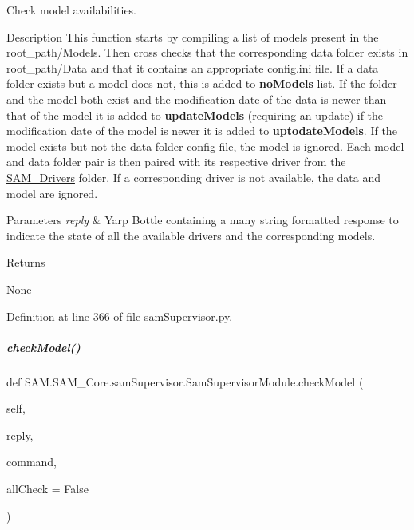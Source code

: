 Check model availabilities. 

\begin{DoxyParagraph}{Description}
This function starts by compiling a list of models present in the {\ttfamily root\+\_\+path/\+Models}. Then cross checks that the corresponding data folder exists in {\ttfamily root\+\_\+path/\+Data} and that it contains an appropriate {\ttfamily config.\+ini} file. If a data folder exists but a model does not, this is added to {\bfseries no\+Models} list. If the folder and the model both exist and the modification date of the data is newer than that of the model it is added to {\bfseries update\+Models} (requiring an update) if the modification date of the model is newer it is added to {\bfseries uptodate\+Models}. If the model exists but not the data folder config file, the model is ignored. Each model and data folder pair is then paired with its respective driver from the \hyperlink{namespaceSAM_1_1SAM__Drivers}{S\+A\+M\+\_\+\+Drivers} folder. If a corresponding driver is not available, the data and model are ignored.
\end{DoxyParagraph}

\begin{DoxyParams}{Parameters}
{\em reply} & Yarp Bottle containing a many string formatted response to indicate the state of all the available drivers and the corresponding models.\\
\hline
\end{DoxyParams}
\begin{DoxyReturn}{Returns}


None 
\end{DoxyReturn}


Definition at line 366 of file sam\+Supervisor.\+py.

\mbox{\label{group__icubclient__SAM__Core_a01bb32119da2f5ab62243e538417ec73}} 
\subparagraph{\texorpdfstring{check\+Model()}{checkModel()}}
{\footnotesize\ttfamily def S\+A\+M.\+S\+A\+M\+\_\+\+Core.\+sam\+Supervisor.\+Sam\+Supervisor\+Module.\+check\+Model (\begin{DoxyParamCaption}\item[{}]{self,  }\item[{}]{reply,  }\item[{}]{command,  }\item[{}]{all\+Check = {\ttfamily False} }\end{DoxyParamCaption})}



